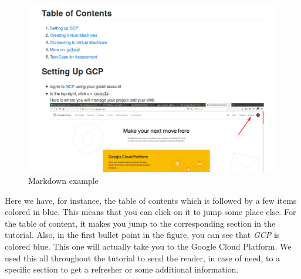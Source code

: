 \begin{figure}
	\centering
	\includegraphics[width=.5\textwidth]{Images/markdown-showcase.png}
	\caption{Markdown example}
	\label{fig:markdown}
\end{figure}

Here we have, for instance, the table of contents which is followed by
a few items colored in blue. This means that you can click on it to
jump some place else. For the table of content, it makes you jump to
the corresponding section in the tutorial. Also, in the first bullet
point in the figure, you can see that \textit{GCP} is colored blue.
This one will actually take you to the Google Cloud Platform.  We used
this all throughout the tutorial to send the reader, in case of need,
to a specific section to get a refresher or some additional
information.
